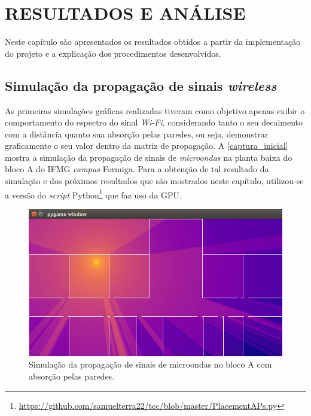 \documentclass[
	12pt,				%
	twoside,			%
	a4paper,			%
	english,			%
	french,				%
	spanish,			%
	brazil				%
	]{abntex2}
\begin{document}
\chapter{RESULTADOS E ANÁLISE}\label{sec:resultados}

Neste capítulo são apresentados os resultados obtidos a partir da
implementação do projeto e a explicação dos procedimentos desenvolvidos.

\section{\texorpdfstring{Simulação da propagação de sinais
\emph{wireless}}{Simulação da propagação de sinais wireless}}\label{simulauxe7uxe3o-da-propagauxe7uxe3o-de-sinais-wireless}

As primeiras simulações gráficas realizadas tiveram como objetivo apenas
exibir o comportamento do espectro do sinal \emph{Wi-Fi}, considerando
tanto o seu decaimento com a distância quanto sua absorção pelas
paredes, ou seja, demonstrar graficamente o seu valor dentro da matriz
de propagação. A \autoref{captura_inicial} mostra a simulação da
propagação de sinais de \emph{microondas} na planta baixa do bloco A do
IFMG \emph{campus} Formiga. Para a obtenção de tal resultado da
simulação e dos próximos resultados que são mostrados neste capítulo,
utilizou-se a versão do \emph{script} Python\footnote{\url{https://github.com/samuelterra22/tcc/blob/master/PlacementAPs.py}}
que faz uso da GPU.

\begin{figure}[!ht]
    \caption{\label{captura_inicial} Simulação da propagação de sinais de microondas no bloco A com absorção pelas paredes.}
    \begin{center}
        \includegraphics[scale=0.6]{imagens/captura-inicial.jpg}
    \end{center}
\end{figure}
\end{document}

